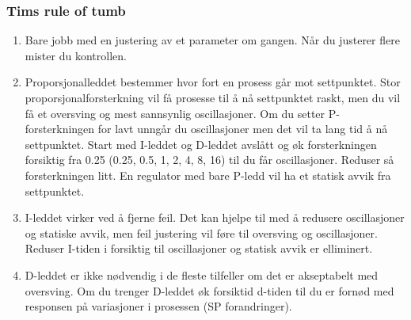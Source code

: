 \subsubsection{Tims rule of tumb}
\begin{enumerate}
	\item Bare jobb med en justering av et parameter om gangen. Når du justerer flere mister du kontrollen. 
	\item Proporsjonalleddet bestemmer hvor fort en prosess går mot settpunktet. Stor proporsjonalforsterkning vil få prosesse til å nå settpunktet raskt, men du vil få et oversving og mest sannsynlig oscillasjoner. Om du setter P-forsterkningen for lavt unngår du oscillasjoner men det vil ta lang tid å nå settpunktet. Start med I-leddet og D-leddet avslått og øk forsterkningen forsiktig  fra 0.25 (0.25, 0.5, 1, 2, 4, 8, 16) til du får oscillasjoner. Reduser så forsterkningen litt. En regulator med bare P-ledd vil ha et statisk avvik fra settpunktet. 
	\item I-leddet virker ved å fjerne feil. Det kan hjelpe til med å redusere oscillasjoner og statiske avvik, men feil justering vil føre til oversving og oscillasjoner. Reduser I-tiden i forsiktig til oscillasjoner og statisk avvik er elliminert. 
	\item D-leddet er ikke nødvendig i de fleste tilfeller om det er akseptabelt med oversving. Om du trenger D-leddet øk forsiktid d-tiden til du er fornød med responsen på variasjoner i prosessen  (SP forandringer).
\end{enumerate}






